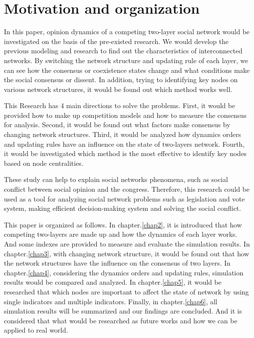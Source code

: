 \section{Motivation and organization}
In this paper, opinion dynamics of a competing two-layer social network would be investigated on the basis of the pre-existed research\parencite{alvarez2016, gomez2015, diep2017, rocca2014}. We would develop the previous modeling and research to find out the characteristics of interconnected networks. By switching the network structure and updating rule of each layer, we can see how the consensus or coexistence states change and what conditions make the social consensus or dissent. In addition, trying to identifying key nodes on various network structures, it would be found out which method works well.  

This Research has 4 main directions to solve the problems. First, it would be provided how to make up competition models and how to measure the consensus for analysis. Second, it would be found out what factors make consensus by changing network structures. Third, it would be analyzed how dynamics orders and updating rules have an influence on the state of two-layers network. Fourth, it would be investigated which method is the most effective to identify key nodes based on node centralities. 

These study can help to explain social networks phenomena, such as social conflict between social opinion and the congress. Therefore, this research could be used as a tool for analyzing social network problems such as legislation and vote system, making efficient decision-making system and solving the social conflict. 

This paper is organized as follows. In chapter.\ref{chap2}, it is introduced that how competing two-layers are made up and how the dynamics of each layer works. And some indexes are provided to measure and evaluate the simulation results. In chapter.\ref{chap3}, with changing network structure, it would be found out that how the network structures have the influence on the consensus of two layers. In chapter.\ref{chap4}, considering the dynamics orders and updating rules, simulation results would be compared and analyzed. In chapter.\ref{chap5}, it would be researched that which nodes are important to affect the state of network by using single indicators and multiple indicators. Finally, in chapter.\ref{chap6}, all simulation results will be summarized and our findings are concluded. And it is considered that what would be researched as future works and how we can be applied to real world. 



